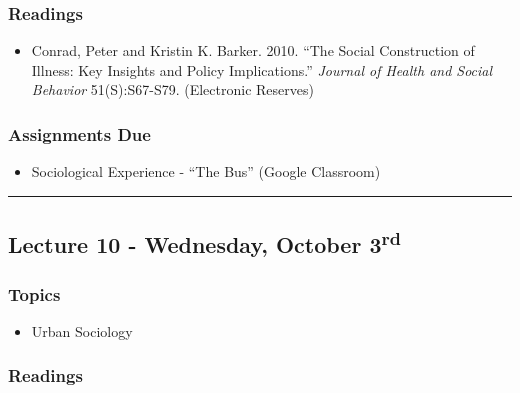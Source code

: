 \documentclass[]{book}
\providecommand{\tightlist}{%
  \setlength{\itemsep}{0pt}\setlength{\parskip}{0pt}}
\theoremstyle{definition}
\theoremstyle{definition}
\theoremstyle{definition}
\theoremstyle{remark}
\begin{document}
\hypertarget{readings-9}{%
\subsubsection*{Readings}\label{readings-9}}

\begin{itemize}
\tightlist
\item
  Conrad, Peter and Kristin K. Barker. 2010. ``The Social Construction
  of Illness: Key Insights and Policy Implications.'' \emph{Journal of
  Health and Social Behavior} 51(S):S67-S79. (Electronic Reserves)
\end{itemize}

\hypertarget{assignments-due-2}{%
\subsubsection*{Assignments Due}\label{assignments-due-2}}

\begin{itemize}
\tightlist
\item
  Sociological Experience - ``The Bus'' (Google Classroom)
\end{itemize}

\begin{center}\rule{0.5\linewidth}{\linethickness}\end{center}

\hypertarget{lecture-10---wednesday-october-3rd}{%
\subsection*{\texorpdfstring{Lecture 10 - Wednesday, October
3\textsuperscript{rd}}{Lecture 10 - Wednesday, October 3rd}}\label{lecture-10---wednesday-october-3rd}}

\hypertarget{topics-11}{%
\subsubsection*{Topics}\label{topics-11}}

\begin{itemize}
\tightlist
\item
  Urban Sociology
\end{itemize}

\hypertarget{readings-10}{%
\subsubsection*{Readings}\label{readings-10}}
\end{document}

